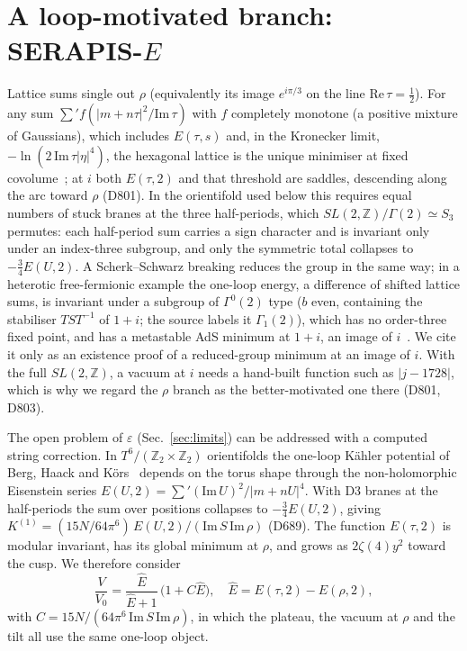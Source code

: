 \documentclass[aps,prd,twocolumn,superscriptaddress,nofootinbib,floatfix]{revtex4-2}
\begin{document}
\section{A loop-motivated branch: SERAPIS-$E$}\label{sec:serapisE}
Lattice sums single out $\rho$ (equivalently its image $e^{i\pi/3}$ on the line $\mathrm{Re}\,\tau=\tfrac12$). For any sum $\sum' f(|m+n\tau|^2/\mathrm{Im}\,\tau)$ with $f$ completely monotone (a positive mixture of Gaussians), which includes $E(\tau,s)$ and, in the Kronecker limit, $-\ln(2\,\mathrm{Im}\,\tau|\eta|^4)$, the hexagonal lattice is the unique minimiser at fixed covolume~\cite{Rankin1953,Montgomery1988,arXiv_1504_01153}; at $i$ both $E(\tau,2)$ and that threshold are saddles, descending along the arc toward $\rho$ (D801). In the orientifold used below this requires equal numbers of stuck branes at the three half-periods, which $SL(2,\mathbb{Z})/\Gamma(2)\simeq S_3$ permutes: each half-period sum carries a sign character and is invariant only under an index-three subgroup, and only the symmetric total collapses to $-\tfrac34E(U,2)$. A Scherk--Schwarz breaking reduces the group in the same way; in a heterotic free-fermionic example the one-loop energy, a difference of shifted lattice sums, is invariant under a subgroup of $\Gamma^0(2)$ type ($b$ even, containing the stabiliser $TST^{-1}$ of $1+i$; the source labels it $\Gamma_1(2)$), which has no order-three fixed point, and has a metastable AdS minimum at $1+i$, an image of $i$~\cite{arXiv_2504_19364}. We cite it only as an existence proof of a reduced-group minimum at an image of $i$. With the full $SL(2,\mathbb{Z})$, a vacuum at $i$ needs a hand-built function such as $|j-1728|$, which is why we regard the $\rho$ branch as the better-motivated one there (D801, D803).

The open problem of $\varepsilon$ (Sec.~\ref{sec:limits}) can be addressed with a computed string correction. In $T^6/(\mathbb{Z}_2\times\mathbb{Z}_2)$ orientifolds the one-loop Kähler potential of Berg, Haack and Körs~\cite{BHK2005} depends on the torus shape through the non-holomorphic Eisenstein series $E(U,2)=\sum'(\mathrm{Im}\,U)^2/|m+nU|^4$. With D3 branes at the half-periods the sum over positions collapses to $-\tfrac34E(U,2)$, giving $K^{(1)}=(15N/64\pi^6)\,E(U,2)/(\mathrm{Im}\,S\,\mathrm{Im}\,\rho)$ (D689). The function $E(\tau,2)$ is modular invariant, has its global minimum at $\rho$, and grows as $2\zeta(4)y^2$ toward the cusp. We therefore consider
\begin{equation}
\frac{V}{V_0}=\frac{\hat E}{\hat E+1}\,\bigl(1+C\hat E\bigr),\quad \hat E=E(\tau,2)-E(\rho,2),
\end{equation}
with $C=15N/(64\pi^6\,\mathrm{Im}\,S\,\mathrm{Im}\,\rho)$,
in which the plateau, the vacuum at $\rho$ and the tilt all use the same one-loop object.
\end{document}
